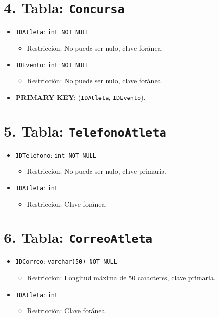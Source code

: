 \section*{4. Tabla: \texttt{Concursa}}
\begin{itemize}
    \item \texttt{IDAtleta}: \texttt{int NOT NULL}
    \begin{itemize}
        \item Restricción: No puede ser nulo, clave foránea.
    \end{itemize}
    \item \texttt{IDEvento}: \texttt{int NOT NULL}
    \begin{itemize}
        \item Restricción: No puede ser nulo, clave foránea.
    \end{itemize}
    \item \textbf{PRIMARY KEY}: (\texttt{IDAtleta}, \texttt{IDEvento}).
\end{itemize}

\section*{5. Tabla: \texttt{TelefonoAtleta}}
\begin{itemize}
    \item \texttt{IDTelefono}: \texttt{int NOT NULL}
    \begin{itemize}
        \item Restricción: No puede ser nulo, clave primaria.
    \end{itemize}
    \item \texttt{IDAtleta}: \texttt{int}
    \begin{itemize}
        \item Restricción: Clave foránea.
    \end{itemize}
\end{itemize}

\section*{6. Tabla: \texttt{CorreoAtleta}}
\begin{itemize}
    \item \texttt{IDCorreo}: \texttt{varchar(50) NOT NULL}
    \begin{itemize}
        \item Restricción: Longitud máxima de 50 caracteres, clave primaria.
    \end{itemize}
    \item \texttt{IDAtleta}: \texttt{int}
    \begin{itemize}
        \item Restricción: Clave foránea.
    \end{itemize}
\end{itemize}

